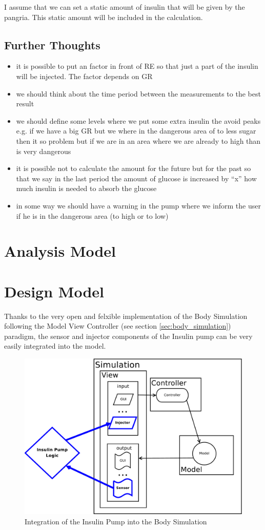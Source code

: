 I assume that we can set a static amount of insulin that will be given by the
pangria. This static amount will be included in the calculation.

\subsection{Further Thoughts}
\begin{itemize}
  \item it is possible to put an factor in front of RE so that just a part of
  the insulin will be injected. The factor depends on GR
  \item we should think about the time period between the measurements to the
  best result
  \item we should define some levels where we put some extra insulin the avoid
  peaks e.g. if we have a big GR but we where in the dangerous area of to less
  sugar then it so problem but if we are in an area where we are already to
  high than is very dangerous
  \item it is possible not to calculate the amount for the future but for the
  past so that we say in the last period the amount of glucose is increased  by
  “x” how much insulin is needed to absorb the glucose
  \item in some way we should have a warning in the pump where we inform the
  user if he is in the dangerous area (to high or to low)
\end{itemize}

\section{Analysis Model}

\section{Design Model}
Thanks to the very open and felxible implementation of the Body Simulation
following the Model View Controller (see section \vref{sec:body_simulation})
paradigm, the sensor and injector components of the Insulin pump can be very
easily integrated into the model.

\begin{figure}[htb]
\centering
\includegraphics[scale=0.39]{images/mvc_insulin_pump}
\caption{Integration of the Insulin Pump into the Body Simulation}
\label{fig:mvc_insulin_pump}
\end{figure}
